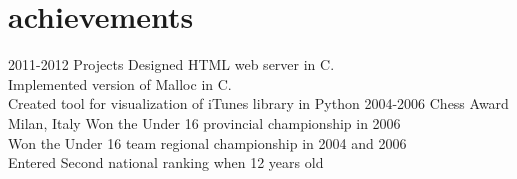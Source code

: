 \documentclass[]{mre-cv}
\begin{document}
\section{achievements}

\begin{entrylist}
\entry
  {2011-2012}
  {Projects }
  { \hspace{3} }
  { Designed HTML web server in C. \\
    Implemented version of Malloc in C.\\
    Created tool for visualization of iTunes library in Python
  }
  \entry
    {2004-2006}
    {Chess Award}
    {Milan, Italy}
    {Won the Under 16 provincial championship in 2006 \\
     Won the Under 16 team regional championship in 2004 and 2006\\
     Entered Second national ranking when 12 years old}
  \end{entrylist}
\end{document}
